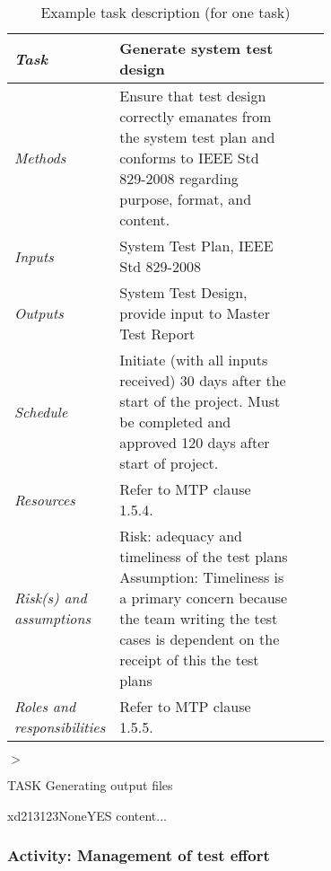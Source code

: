 			\begin{table}
			\caption{Example task description (for one task)}
			\label{tab:example-task-description}
			\centering
			\begin{tabular}{@{}lp{0.7\linewidth}lp{}}
			\toprule
			\emph{Task} & Generate system test design \\
			\midrule
			\emph{Methods} & Ensure that test design correctly emanates from the system test plan and conforms
			to IEEE Std 829-2008 regarding purpose, format, and content.\\
			\emph{Inputs} & System Test Plan, IEEE Std 829-2008 \\
			\emph{Outputs} & System Test Design, provide input to Master Test Report \\
			\emph{Schedule} & Initiate (with all inputs received) 30 days after the start of the project. Must be
			completed and approved 120 days after start of project. \\
			\emph{Resources} & Refer to MTP clause 1.5.4. \\
			\emph{Risk(s) and assumptions} & Risk: adequacy and timeliness of the test plans
			Assumption: Timeliness is a primary concern because the team writing the test
			cases is dependent on the receipt of this the test plans \\
			\emph{Roles and responsibilities} & Refer to MTP clause 1.5.5. \\
			\bottomrule
			\end{tabular}
			\end{table}
			$>$

	\taskdescription
	{
		TASK
	}
	{
		Generating output files
	}
	{
		
	}
	
	\begin{testcase}{xd}{213123}{None}{YES}
		content...
	\end{testcase}

	\subsubsection{Activity: Management of test effort} \label{s:details-of-the-master-test-plan:activity-management-of-test-effort}
	
